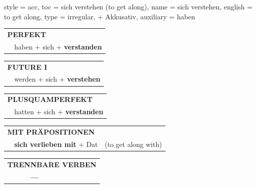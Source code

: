 \begin{verbentry}{
  style = {acc},
  toc = {sich verstehen (to get along)},
  name = {sich verstehen},
  english = {to get along},
  type = {irregular, + Akkusativ},
  auxiliary = {haben}
}
    \vspace{10pt}

 \begin{tabular}{rl}
     \multicolumn{2}{l}{\textbf{PERFEKT}}\\
    &haben + sich + \textbf{verstanden}\\
  \end{tabular}
\hfill
   \begin{tabular}{rl}
   
    \multicolumn{2}{l}{\textbf{FUTURE I} }\\
    &werden + sich + \textbf{verstehen}\\
 
  \end{tabular}
\hfill
   \begin{tabular}{rl}
      \multicolumn{2}{l}{\textbf{PLUSQUAMPERFEKT}}\\
    &hatten + sich + \textbf{verstanden}\\
  \end{tabular}
  
\vspace{10pt}

   \begin{tabular}{lll}
      \multicolumn{3}{l}{\textbf{MIT PRÄPOSITIONEN}}\\
& \textbf{sich verlieben mit} + Dat & (to get along with)
  \end{tabular}
\hfill
\begin{tabular}{lll}
\multicolumn{3}{l}{\textbf{TRENNBARE VERBEN}}\\
& \textbf{---} & \\
\end{tabular}
  
  \vspace{-5pt}
\end{verbentry}

